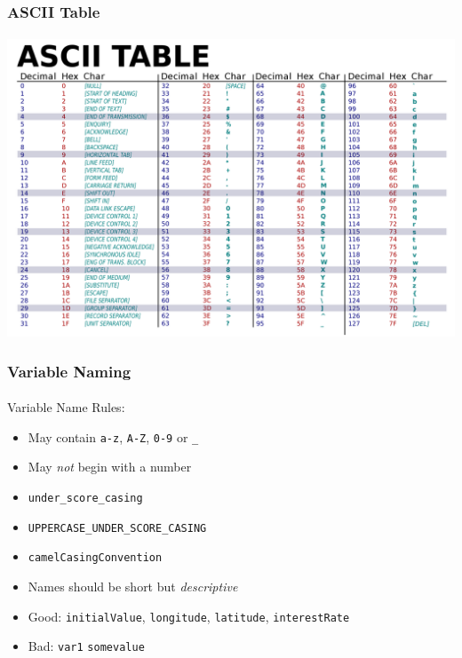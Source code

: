 \documentclass[]{beamer}
\begin{document}
\begin{frame}
    \frametitle{ASCII Table}
    \framesubtitle{}

\begin{center}
\includegraphics[scale=0.14]{images/ascii}
\end{center}
\end{frame}

\begin{frame}[fragile]
    \frametitle{Variable Naming}
    \framesubtitle{}
    
Variable Name Rules:    
\begin{itemize}
  \item<2-> May contain \texttt{a-z}, \texttt{A-Z}, 
  \texttt{0-9} or \texttt{_}
  \item<3-> May \emph{not} begin with a number
\end{itemize}

\begin{itemize}%
  \item<5-> \texttt{under_score_casing}
  \item<6-> \texttt{UPPERCASE_UNDER_SCORE_CASING} 
  \item<7-> \texttt{camelCasingConvention}
  \item<8-> Names should be short but \emph{descriptive}
  \item<9-> Good: \texttt{initialValue}, \texttt{longitude}, \texttt{latitude}, \texttt{interestRate}
  \item<10-> Bad: \texttt{var1} \texttt{somevalue}
\end{itemize}

\end{frame}
\end{document}
